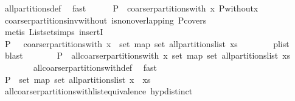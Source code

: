 \begin{isabellebody}
\ all{\isacharunderscore}partitions{\isacharunderscore}def\ \isamarkupfalse%
\ fast\isanewline
\ \ \ \ \isamarkupfalse%
\ {\isachardoublequoteopen}P\ {\isasymin}\ coarser{\isacharunderscore}partitions{\isacharunderscore}with\ x\ {\isacharquery}P{\isacharunderscore}without{\isacharunderscore}x{\isachardoublequoteclose}\isanewline
\ \ \ \ \ \ \isamarkupfalse%
\ coarser{\isacharunderscore}partitions{\isacharunderscore}inv{\isacharunderscore}without\ is{\isacharunderscore}non{\isacharunderscore}overlapping\ P{\isacharunderscore}covers\isanewline
\ \ \ \ \ \ \isamarkupfalse%
\ {\isacharparenleft}metis\ List{\isachardot}set{\isacharunderscore}simps{\isacharparenleft}{}{\isacharparenright}\ insertI{}{\isacharparenright}\isanewline
\ \ \ \ \isamarkupfalse%
\ \isamarkupfalse%
\ {\isachardoublequoteopen}P\ {\isasymin}\ {\isasymUnion}\ {\isacharparenleft}coarser{\isacharunderscore}partitions{\isacharunderscore}with\ x\ {\isacharbackquote}\ set\ {\isacharparenleft}map\ set\ {\isacharparenleft}all{\isacharunderscore}partitions{\isacharunderscore}list\ xs{\isacharparenright}{\isacharparenright}{\isacharparenright}{\isachardoublequoteclose}\isanewline
\ \ \ \ \ \ \isamarkupfalse%
\ p{\isacharunderscore}list\ \isamarkupfalse%
\ blast\isanewline
\ \ \ \ \isamarkupfalse%
\ \isamarkupfalse%
\ {\isachardoublequoteopen}P\ {\isasymin}\ all{\isacharunderscore}coarser{\isacharunderscore}partitions{\isacharunderscore}with\ x\ {\isacharparenleft}set\ {\isacharparenleft}map\ set\ {\isacharparenleft}all{\isacharunderscore}partitions{\isacharunderscore}list\ xs{\isacharparenright}{\isacharparenright}{\isacharparenright}{\isachardoublequoteclose}\isanewline
\ \ \ \ \ \ \isamarkupfalse%
\ all{\isacharunderscore}coarser{\isacharunderscore}partitions{\isacharunderscore}with{\isacharunderscore}def\ \isamarkupfalse%
\ fast\isanewline
\ \ \ \ \isamarkupfalse%
\ \isamarkupfalse%
\ {\isachardoublequoteopen}P\ {\isasymin}\ set\ {\isacharparenleft}map\ set\ {\isacharparenleft}all{\isacharunderscore}partitions{\isacharunderscore}list\ {\isacharparenleft}x\ {\isacharhash}\ xs{\isacharparenright}{\isacharparenright}{\isacharparenright}{\isachardoublequoteclose}\isanewline
\ \ \ \ \ \ \isamarkupfalse%
\ all{\isacharunderscore}coarser{\isacharunderscore}partitions{\isacharunderscore}with{\isacharunderscore}list{\isacharunderscore}equivalence\ hyp{\isacharunderscore}distinct\isanewline

\end{isabellebody}
